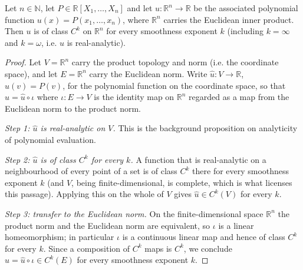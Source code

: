 \begin{lemma}
Let $n\in\mathbb{N}$, let $P\in\mathbb{R}[X_1,\dots,X_n]$ and let
$u:\mathbb{R}^n\to\mathbb{R}$ be the associated polynomial function
$u(x)=P(x_1,\dots,x_n)$, where $\mathbb{R}^n$ carries the Euclidean inner
product. Then $u$ is of class $C^k$ on $\mathbb{R}^n$ for every smoothness
exponent $k$ (including $k=\infty$ and $k=\omega$, i.e. $u$ is real-analytic).
\end{lemma}
\begin{proof}
Let $V=\mathbb{R}^n$ carry the product topology and norm (i.e. the coordinate
space), and let $E=\mathbb{R}^n$ carry the Euclidean norm. Write
$\widehat{u}:V\to\mathbb{R}$, $\widehat{u}(v)=P(v)$, for the polynomial function
on the coordinate space, so that $u=\widehat{u}\circ\iota$ where
$\iota:E\to V$ is the identity map on $\mathbb{R}^n$ regarded as a map from the
Euclidean norm to the product norm.

\emph{Step 1: $\widehat{u}$ is real-analytic on $V$.} This is the background
proposition on analyticity of polynomial evaluation.

\emph{Step 2: $\widehat{u}$ is of class $C^k$ for every $k$.} A function that is
real-analytic on a neighbourhood of every point of a set is of class $C^k$ there
for every smoothness exponent $k$ (and $V$, being finite-dimensional, is
complete, which is what licenses this passage). Applying this on the whole of
$V$ gives $\widehat{u}\in C^k(V)$ for every $k$.

\emph{Step 3: transfer to the Euclidean norm.} On the finite-dimensional space
$\mathbb{R}^n$ the product norm and the Euclidean norm are equivalent, so
$\iota$ is a linear homeomorphism; in particular $\iota$ is a continuous linear
map and hence of class $C^k$ for every $k$. Since a composition of $C^k$ maps is
$C^k$, we conclude $u=\widehat{u}\circ\iota\in C^k(E)$ for every smoothness
exponent $k$.
\end{proof}
